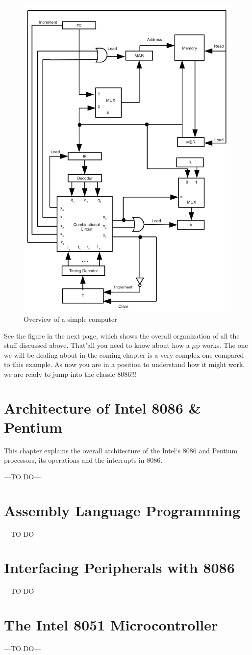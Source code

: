 \documentclass{book}
\begin{document}
\begin{figure}[h]

\begin{center}
  \includegraphics[scale=1]{imgs/simple_computer.png}
\end{center}
\caption{Overview of a simple computer}
\end{figure}


See the figure in the next page, which shows the overall organization of all the stuff discussed above. That\rq all you need to know about how a $\mu$p works. The one we will be dealing about in the coming chapter is a very complex one compared to this example. As now you are in a position to understand how it might work, we are ready to jump into the classic 8086!!!
\pagebreak
\chapter{Architecture of Intel 8086 \& Pentium}
This chapter explains the overall architecture of the Intel`s 8086 and Pentium
processors, its operations and
the interrupts in 8086.

---TO DO---


\chapter{Assembly Language Programming}
---TO DO---
\chapter{Interfacing Peripherals with 8086}
---TO DO---
\chapter{The Intel 8051 Microcontroller}
---TO DO---
\end{document}
